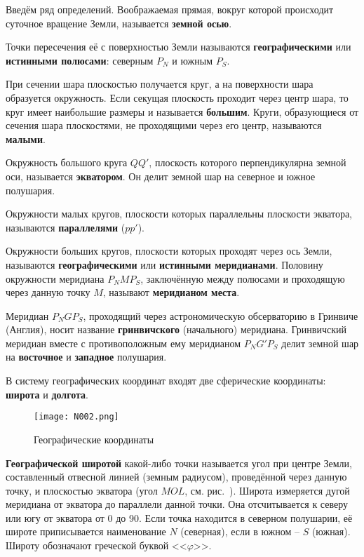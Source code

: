 Введём ряд определений. Воображаемая прямая, вокруг которой происходит
суточное вращение Земли, называется \textbf{земной осью}.

Точки пересечения её с поверхностью Земли называются
\textbf{географическими} или \textbf{истинными полюсами}: северным
$P_N$ и южным $P_S$.

При сечении шара плоскостью получается круг, а на поверхности шара
образуется окружность. Если секущая плоскость проходит через центр
шара, то круг имеет наибольшие размеры и называется
\textbf{большим}. Круги, образующиеся от сечения шара плоскостями, не
проходящими через его центр, называются \textbf{малыми}.

Окружность большого круга $QQ'$, плоскость которого перпендикулярна
земной оси, называется \textbf{экватором}. Он делит земной шар на
северное и южное полушария.

Окружности малых кругов, плоскости которых параллельны плоскости
экватора, называются \textbf{параллелями} ($pp'$).

Окружности больших кругов, плоскости которых проходят через ось Земли,
называются 
\textbf{географическими} или \textbf{истинными
  меридианами}. Половину окружности меридиана $P_NMP_S$, заключённую
между полюсами и проходящую через данную точку $M$, называют
\textbf{меридианом места}.

Меридиан $P_NGP_S$, проходящий через астрономическую обсерваторию в
Гринвиче (Англия), носит название \textbf{гринвичского} (начального)
меридиана. Гринвичский меридиан вместе с противоположным ему
меридианом $P_NG'P_S$ делит земной шар на \textbf{восточное} и
\textbf{западное} полушария.

В систему географических координат входят две сферические координаты:
 \textbf{широта} и \textbf{долгота}.

\begin{figure}[htb]
  \centering{}
  \texttt{[image: N002.png]}
  \caption{Географические координаты}
  \label{fig:N2}
\end{figure}

\textbf{Географической широтой}
какой-либо точки называется угол при центре Земли, составленный
отвесной линией (земным радиусом), проведённой через данную точку, и
плоскостью экватора (угол $MOL$, см. рис.~). Широта измеряется
дугой меридиана от экватора до параллели данной точки. Она
отсчитывается к северу или югу от экватора от 0 до 90\gr. Если точка
находится в северном полушарии, её широте приписывается наименование
$N$ (северная), если в южном \--- $S$ (южная). Широту обозначают
греческой буквой <<$\varphi$>>.


